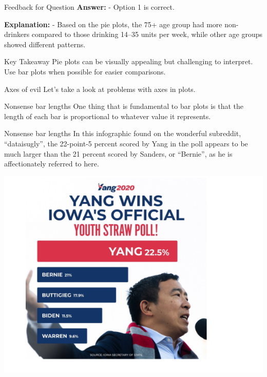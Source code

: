 \documentclass[
  ignorenonframetext,
]{beamer}
\begin{document}
\begin{frame}{Feedback for Question}
\label{feedback-for-question}
\textbf{Answer:} - Option 1 is correct.

\textbf{Explanation:} - Based on the pie plots, the 75+ age group had
more non-drinkers compared to those drinking 14--35 units per week,
while other age groups showed different patterns.
\end{frame}

\begin{frame}{Key Takeaway}
\label{key-takeaway}
Pie plots can be visually appealing but challenging to interpret. Use
bar plots when possible for easier comparisons.
\end{frame}

\begin{frame}{Axes of evil}
\label{axes-of-evil}
Let's take a look at problems with axes in plots.
\end{frame}

\begin{frame}{Nonsense bar lengths}
\label{nonsense-bar-lengths}
One thing that is fundamental to bar plots is that the length of each
bar is proportional to whatever value it represents.
\end{frame}

\begin{frame}{Nonsense bar lengths}
\label{nonsense-bar-lengths-1}
In this infographic found on the wonderful subreddit, ``dataisugly'',
the 22-point-5 percent scored by Yang in the poll appears to be much
larger than the 21 percent scored by Sanders, or ``Bernie'', as he is
affectionately referred to here.

\includegraphics{../images/im107.png}
\end{frame}
\end{document}
